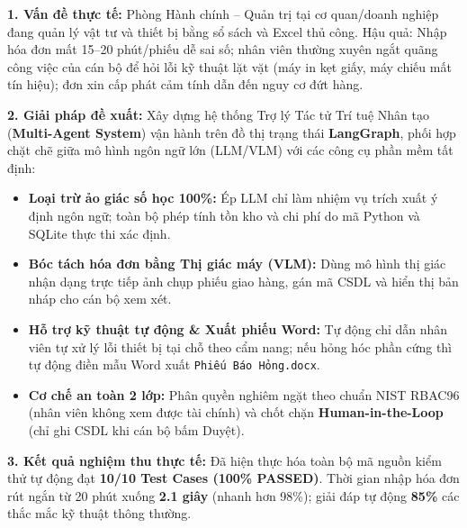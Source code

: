 \documentclass[11pt,a4paper]{article}
\begin{document}
\begin{summarybox}
\textbf{1. Vấn đề thực tế:} Phòng Hành chính -- Quản trị tại cơ quan/doanh nghiệp đang quản lý vật tư và thiết bị bằng sổ sách và Excel thủ công. Hậu quả: Nhập hóa đơn mất 15--20 phút/phiếu dễ sai số; nhân viên thường xuyên ngắt quãng công việc của cán bộ để hỏi lỗi kỹ thuật lặt vặt (máy in kẹt giấy, máy chiếu mất tín hiệu); đơn xin cấp phát cảm tính dẫn đến nguy cơ đứt hàng.

\textbf{2. Giải pháp đề xuất:} Xây dựng hệ thống Trợ lý Tác tử Trí tuệ Nhân tạo (\textbf{Multi-Agent System}) vận hành trên đồ thị trạng thái \textbf{LangGraph}, phối hợp chặt chẽ giữa mô hình ngôn ngữ lớn (LLM/VLM) với các công cụ phần mềm tất định:
\begin{itemize}[leftmargin=1.2em, itemsep=1pt]
    \item \textbf{Loại trừ ảo giác số học 100\%:} Ép LLM chỉ làm nhiệm vụ trích xuất ý định ngôn ngữ; toàn bộ phép tính tồn kho và chi phí do mã Python và SQLite thực thi xác định.
    \item \textbf{Bóc tách hóa đơn bằng Thị giác máy (VLM):} Dùng mô hình thị giác nhận dạng trực tiếp ảnh chụp phiếu giao hàng, gán mã CSDL và hiển thị bản nháp cho cán bộ xem xét.
    \item \textbf{Hỗ trợ kỹ thuật tự động \& Xuất phiếu Word:} Tự động chỉ dẫn nhân viên tự xử lý lỗi thiết bị tại chỗ theo cẩm nang; nếu hỏng hóc phần cứng thì tự động điền mẫu Word xuất \texttt{Phiếu Báo Hỏng.docx}.
    \item \textbf{Cơ chế an toàn 2 lớp:} Phân quyền nghiêm ngặt theo chuẩn NIST RBAC96 (nhân viên không xem được tài chính) và chốt chặn \textbf{Human-in-the-Loop} (chỉ ghi CSDL khi cán bộ bấm Duyệt).
\end{itemize}

\textbf{3. Kết quả nghiệm thu thực tế:} Đã hiện thực hóa toàn bộ mã nguồn kiểm thử tự động đạt \textbf{10/10 Test Cases (100\% PASSED)}. Thời gian nhập hóa đơn rút ngắn từ 20 phút xuống \textbf{2.1 giây} (nhanh hơn 98\%); giải đáp tự động \textbf{85\%} các thắc mắc kỹ thuật thông thường.
\end{summarybox}

\newpage

\end{document}
